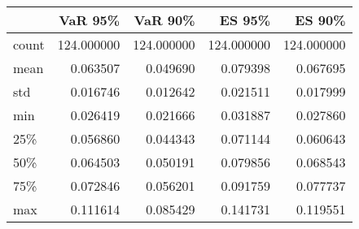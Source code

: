 \begin{tabular}{lrrrr}
\toprule
{} &     VaR 95\% &     VaR 90\% &      ES 95\% &      ES 90\% \\
\midrule
count &  124.000000 &  124.000000 &  124.000000 &  124.000000 \\
mean  &    0.063507 &    0.049690 &    0.079398 &    0.067695 \\
std   &    0.016746 &    0.012642 &    0.021511 &    0.017999 \\
min   &    0.026419 &    0.021666 &    0.031887 &    0.027860 \\
25\%   &    0.056860 &    0.044343 &    0.071144 &    0.060643 \\
50\%   &    0.064503 &    0.050191 &    0.079856 &    0.068543 \\
75\%   &    0.072846 &    0.056201 &    0.091759 &    0.077737 \\
max   &    0.111614 &    0.085429 &    0.141731 &    0.119551 \\
\bottomrule
\end{tabular}
